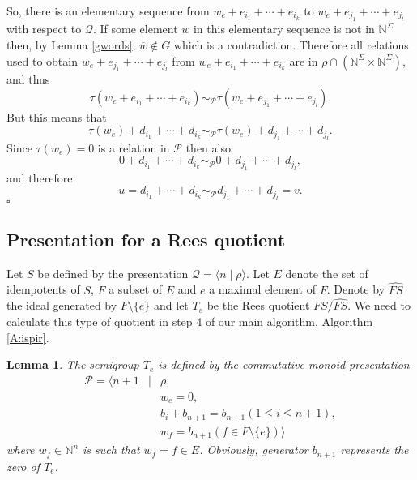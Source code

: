 \documentclass[12pt]{article}
\newtheorem{lemma}{Lemma}
\newenvironment{proof}{{\it Proof.\/}}{$\square$\\}
\begin{document}
\begin{proof}
So, there is an elementary sequence from 
$w_e+e_{i_1}+\cdots+e_{i_k}$ to $w_e+e_{j_1}+\cdots +e_{j_l}$
with respect to $\mathcal{Q}$. If some element $w$ in this
elementary sequence is not in $\mathbb{N}^{\Sigma}$
then, by Lemma \ref{gwords}, $\overline{w} \notin G$ which is a 
contradiction. Therefore all relations used to obtain 
$w_e+e_{j_1}+\cdots +e_{j_l}$ from $w_e+e_{i_1}+\cdots+e_{i_k}$
are in $\rho\cap(\mathbb{N}^{\Sigma}\times\mathbb{N}^{\Sigma})$, and thus 
$$\tau(w_e+e_{i_1}+\cdots+e_{i_k})\sim_{\mathcal{P}}
\tau(w_e+e_{j_1}+\cdots +e_{j_l}).$$
But this means that
$$\tau(w_e)+d_{i_1}+\cdots+d_{i_k}\sim_{\mathcal{P}}
\tau(w_e)+d_{j_1}+\cdots +d_{j_l}.$$
Since $\tau(w_e)=0$ is a relation in $\mathcal{P}$ then also
$$0+d_{i_1}+\cdots+d_{i_k}\sim_{\mathcal{P}}
0+d_{j_1}+\cdots +d_{j_l},$$
and therefore
$$u=d_{i_1}+\cdots+d_{i_k}\sim_{\mathcal{P}}d_{j_1}+\cdots +d_{j_l}=v.$$
\end{proof}

\subsection{Presentation for a Rees quotient}\label{s:rqpres}

Let $S$ be defined by the presentation
${\mathcal Q}=\langle n\mid \rho\rangle$.
Let $E$ denote the set of idempotents of $S$, $F$ 
a subset of $E$ and $e$ a maximal element of $F$.
Denote by $\widehat{FS}$ the ideal generated by
$F\setminus \{e\}$ and let $T_e$ be the Rees quotient
$FS/\widehat{FS}$. We need to calculate this type of
quotient in step 4 of our main 
algorithm, Algorithm \ref{A:ispir}.

\begin{lemma}
The semigroup $T_e$ is defined by the  commutative monoid presentation
\begin{eqnarray*}
\mathcal{P}=\langle n+1&\mid& \rho,\\
&&w_e=0,\\
&&b_i+b_{n+1}=b_{n+1} (1\leq i\leq n+1),\\
&& w_f=b_{n+1} (f\in F\setminus\{e\})\rangle
\end{eqnarray*}
where $w_f\in \mathbb{N}^n$ is such that $\overline{w_f}=f\in E$.
Obviously, generator $b_{n+1}$ represents the zero of $T_e$.
\end{lemma}
\end{document}
